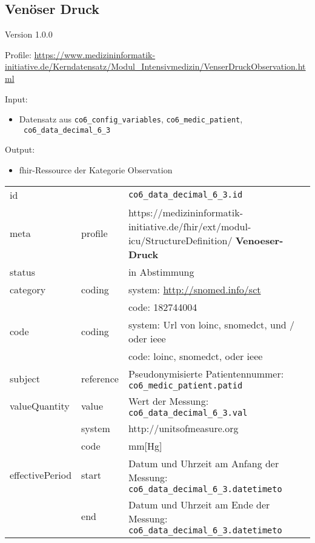 \subsection{Venöser Druck} 
\noindent Version 1.0.0

\noindent Profile: \url{https://www.medizininformatik-initiative.de/Kerndatensatz/Modul_Intensivmedizin/VenserDruckObservation.html}

\noindent Input:
\begin{itemize}
	\item Datensatz aus \texttt{co6\_config\_variables}, \texttt{co6\_medic\_patient}, \\ \texttt{
co6\_data\_decimal\_6\_3}
\end{itemize}
Output:
\begin{itemize}
        \item \ac{fhir}-Ressource der Kategorie \glqq Observation\grqq{}
\end{itemize}
\begin{longtable}{|l|l|p{7.5cm}|}
        \hline
        \rowcolor{lightgray} \multicolumn{3}{|l|}{Data Mapping (inhaltlich)} \\ \hline
        id &  & \texttt{co6\_data\_decimal\_6\_3.id} \\ \hline
	meta & profile & https://medizininformatik-initiative.de/fhir/ext/modul-icu/StructureDefinition/\textbf{
Venoeser-Druck} \\ \hline 
	status &  & in Abstimmung  \\ \hline 
	category & coding & system: \url{http://snomed.info/sct} \\
\cline{3-3}
	& & code: 182744004 \\ \hline
	code & coding & system: Url von \ac{loinc}, \ac{snomedct}, und / oder \ac{ieee} \\ 
	\cline{3-3} 
	 &  & code: \ac{loinc}, \ac{snomedct}, oder \ac{ieee} \\ \hline
	subject & reference & Pseudonymisierte Patientennummer: \texttt{co6\_medic\_patient.patid} \\ \hline
	valueQuantity & value & Wert der Messung: \texttt{
co6\_data\_decimal\_6\_3.val} \\
        \cline{2-3}
         & system & http://unitsofmeasure.org \\
         \cline{2-3}
         & code & mm[Hg] \\ \hline
    effectivePeriod & start & Datum und Uhrzeit am Anfang der Messung: \texttt{
co6\_data\_decimal\_6\_3.datetimeto} \\
    \cline{2-3}
     & end & Datum und Uhrzeit am Ende der Messung: \texttt{
co6\_data\_decimal\_6\_3.datetimeto} \\ \hline
\end{longtable}


